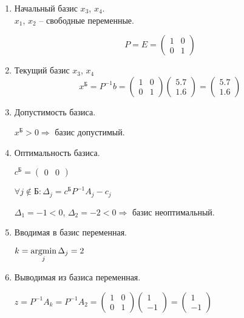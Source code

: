 \begin{enumerate}
\begin{enumerate}

	\item Начальный базис $x_3$, $x_4$.\\
	 $x_1$, $x_2$ -- свободные переменные.
	
	\begin{displaymath}
		P = E = \begin{pmatrix}
			1 & 0 \\ 0 & 1
		\end{pmatrix}
	\end{displaymath}

	\item Текущий базис $x_3$, $x_4$\\
	\begin{displaymath}
		x^{\text{Б}} = P^{-1}b = \begin{pmatrix}
			1 & 0 \\ 0 & 1
		\end{pmatrix}
		\begin{pmatrix}
			5.7 \\ 1.6
		\end{pmatrix}
		=
		\begin{pmatrix}
			5.7 \\ 1.6
		\end{pmatrix}
	\end{displaymath}

	\item Допустимость базиса.
	
	$x^{\text{Б}} > 0 \Rightarrow$ базис допустимый.

	\item Оптимальность базиса.
	
	$c^\text{Б} = \begin{pmatrix}
		0 & 0
	\end{pmatrix}$

	$\forall j \notin \text{Б} : \Delta_j = c^\text{Б} P^{-1} A_j - c_j$

	$\Delta_1 = -1 < 0$, $\Delta_2 = -2 < 0 \Rightarrow$ базис неоптимальный.

	\item Вводимая в базис переменная.
	
	$k = \operatorname*{argmin}\limits_j \Delta_j = 2$
	
	\item Выводимая из базиса переменная.
	
	$z = P^{-1} A_k = P^{-1} A_2 = \begin{pmatrix}
		1 & 0 \\ 0 & 1
	\end{pmatrix}
	\begin{pmatrix}
		1 \\ -1
	\end{pmatrix}
	=
	\begin{pmatrix}
		1 \\ -1
	\end{pmatrix}$
	

\end{enumerate}
\end{enumerate}
